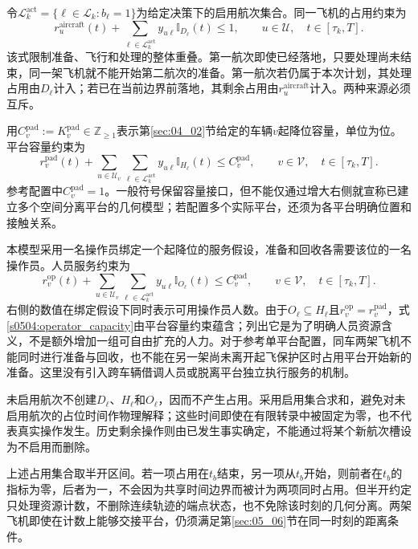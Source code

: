 令$\mathcal L_k^{\mathrm{act}}=\{\ell\in\mathcal L_k:b_\ell=1\}$为给定决策下的启用航次集合。同一飞机的占用约束为
\begin{equation}
 r_u^{\mathrm{aircraft}}(t)
 +\sum_{\ell\in\mathcal L_k^{\mathrm{act}}}
 y_{u\ell}\mathbb I_{D_\ell}(t)\le1,
 \qquad u\in\mathcal U,\quad t\in[\tau_k,T].
 \label{s0504:aircraft_capacity}
\end{equation}
该式限制准备、飞行和处理的整体重叠。第一航次即使已经落地，只要处理尚未结束，同一架飞机就不能开始第二航次的准备。第一航次若仍属于本次计划，其处理占用由$D_\ell$计入；若已在当前边界前落地，其剩余占用由$r_u^{\mathrm{aircraft}}$计入。两种来源必须互斥。

用$C_v^{\mathrm{pad}}:=K_v^{\mathrm{pad}}\in\mathbb Z_{\ge1}$表示第\ref{sec:04_02}节给定的车辆$v$起降位容量，单位为位。平台容量约束为
\begin{equation}
 r_v^{\mathrm{pad}}(t)
 +\sum_{u\in\mathcal U_v}
 \sum_{\ell\in\mathcal L_k^{\mathrm{act}}}
 y_{u\ell}\mathbb I_{H_\ell}(t)
 \le C_v^{\mathrm{pad}},
 \qquad v\in\mathcal V,\quad t\in[\tau_k,T].
 \label{s0504:pad_capacity}
\end{equation}
参考配置中$C_v^{\mathrm{pad}}=1$。一般符号保留容量接口，但不能仅通过增大右侧就宣称已建立多个空间分离平台的几何模型；若配置多个实际平台，还须为各平台明确位置和接触关系。

本模型采用一名操作员绑定一个起降位的服务假设，准备和回收各需要该位的一名操作员。人员服务约束为
\begin{equation}
 r_v^{\mathrm{op}}(t)
 +\sum_{u\in\mathcal U_v}
 \sum_{\ell\in\mathcal L_k^{\mathrm{act}}}
 y_{u\ell}\mathbb I_{O_\ell}(t)
 \le C_v^{\mathrm{pad}},
 \qquad v\in\mathcal V,\quad t\in[\tau_k,T].
 \label{s0504:operator_capacity}
\end{equation}
右侧的数值在绑定假设下同时表示可用操作员人数。由于$O_\ell\subseteq H_\ell$且$r_v^{\mathrm{op}}=r_v^{\mathrm{pad}}$，式\eqref{s0504:operator_capacity}由平台容量约束蕴含；列出它是为了明确人员资源含义，不是额外增加一组可自由扩充的人力。对于参考单平台配置，同车两架飞机不能同时进行准备与回收，也不能在另一架尚未离开起飞保护区时占用平台开始新的准备。这里没有引入跨车辆借调人员或脱离平台独立执行服务的机制。

未启用航次不创建$D_\ell$、$H_\ell$和$O_\ell$，因而不产生占用。采用启用集合求和，避免对未启用航次的占位时间作物理解释；这些时间即使在有限转录中被固定为零，也不代表真实操作发生。历史剩余操作则由已发生事实确定，不能通过将某个新航次槽设为不启用而删除。

上述占用集合取半开区间。若一项占用在$t_b$结束，另一项从$t_b$开始，则前者在$t_b$的指标为零，后者为一，不会因为共享时间边界而被计为两项同时占用。但半开约定只处理资源计数，不删除连续轨迹的端点状态，也不免除该时刻的几何分离。两架飞机即使在计数上能够交接平台，仍须满足第\ref{sec:05_06}节在同一时刻的距离条件。

